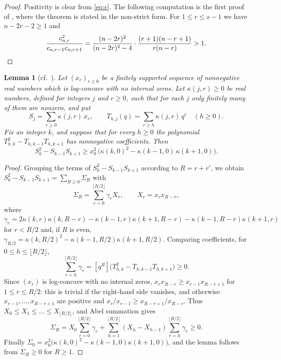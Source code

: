 \documentclass{amsart}
\newtheorem{lemma}[theorem]{Lemma}
\theoremstyle{definition}
\theoremstyle{remark}
\numberwithin{equation}{section}
\numberwithin{table}{section}
\newcommand{\coef}[1]{[#1]}
\begin{document}
\begin{proof}
Positivity is clear from \eqref{eq:c}. The following computation is the first proof of \cite[Theorem~1.2]{GLL}, where the theorem is stated in the non-strict form. For $1\le r\le s-1$ we have $n-2r-2\ge 1$ and
\[
\frac{c_{n,r}^2}{c_{n,r-1}c_{n,r+1}}=\frac{(n-2r)^2}{(n-2r)^2-4}\cdot\frac{(r+1)(n-r+1)}{r(n-r)}>1. \qedhere
\]
\end{proof}

\begin{lemma}[{cf.\ \cite[Lemmas~2.1 and~2.2, Theorem~2.3]{WY}}]\label{lem:tails}
Let $(x_r)_{r\ge 0}$ be a finitely supported sequence of nonnegative real numbers which is log-concave with no internal zeros. Let $\kappa(j,r)\ge 0$ be real numbers, defined for integers $j$ and $r\ge 0$, such that for each $j$ only finitely many of them are nonzero, and put
\[
S_j=\sum_{r\ge 0}\kappa(j,r)\,x_r,\qquad T_{h,j}(q)=\sum_{r\ge h}\kappa(j,r)\,q^r\quad(h\ge 0).
\]
Fix an integer $k$, and suppose that for every $h\ge 0$ the polynomial $T_{h,k}^2-T_{h,k-1}T_{h,k+1}$ has nonnegative coefficients. Then
\[
S_k^2-S_{k-1}S_{k+1}\ge x_0^2\,\bigl(\kappa(k,0)^2-\kappa(k-1,0)\,\kappa(k+1,0)\bigr).
\]
\end{lemma}

\begin{proof}
Grouping the terms of $S_k^2-S_{k-1}S_{k+1}$ according to $R=r+r'$, we obtain $S_k^2-S_{k-1}S_{k+1}=\sum_{R\ge 0}\Sigma_R$ with
\[
\Sigma_R=\sum_{r=0}^{\lfloor R/2\rfloor}\gamma_r X_r,\qquad X_r=x_rx_{R-r},
\]
where $\gamma_r=2\kappa(k,r)\kappa(k,R-r)-\kappa(k-1,r)\kappa(k+1,R-r)-\kappa(k-1,R-r)\kappa(k+1,r)$ for $r<R/2$ and, if $R$ is even, $\gamma_{R/2}=\kappa(k,R/2)^2-\kappa(k-1,R/2)\kappa(k+1,R/2)$. Comparing coefficients, for $0\le h\le \lfloor R/2\rfloor$,
\[
\sum_{r=h}^{\lfloor R/2\rfloor}\gamma_r=\coef{q^R}\bigl(T_{h,k}^2-T_{h,k-1}T_{h,k+1}\bigr)\ge 0 .
\]
Since $(x_r)$ is log-concave with no internal zeros, $x_rx_{R-r}\ge x_{r-1}x_{R-r+1}$ for $1\le r\le R/2$: this is trivial if the right-hand side vanishes, and otherwise $x_{r-1},\dots,x_{R-r+1}$ are positive and $x_r/x_{r-1}\ge x_{R-r+1}/x_{R-r}$. Thus $X_0\le X_1\le\dots\le X_{\lfloor R/2\rfloor}$, and Abel summation gives
\[
\Sigma_R=X_0\sum_{r=0}^{\lfloor R/2\rfloor}\gamma_r+\sum_{h=1}^{\lfloor R/2\rfloor}(X_h-X_{h-1})\sum_{r=h}^{\lfloor R/2\rfloor}\gamma_r\ge 0 .
\]
Finally $\Sigma_0=x_0^2\bigl(\kappa(k,0)^2-\kappa(k-1,0)\kappa(k+1,0)\bigr)$, and the lemma follows from $\Sigma_R\ge 0$ for $R\ge 1$.
\end{proof}
\end{document}
